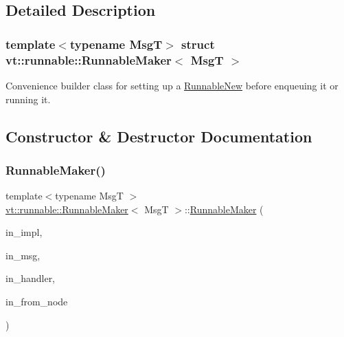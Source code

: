 \subsection{Detailed Description}
\subsubsection*{template$<$typename MsgT$>$\newline
struct vt\+::runnable\+::\+Runnable\+Maker$<$ Msg\+T $>$}

Convenience builder class for setting up a {\ttfamily \hyperlink{structvt_1_1runnable_1_1_runnable_new}{Runnable\+New}} before enqueuing it or running it. 

\subsection{Constructor \& Destructor Documentation}
\mbox{\label{structvt_1_1runnable_1_1_runnable_maker_a8bdfaa900a10d5b950428476ae57c829}} 
\subsubsection{\texorpdfstring{Runnable\+Maker()}{RunnableMaker()}\hspace{0.1cm}{\footnotesize\ttfamily [1/3]}}
{\footnotesize\ttfamily template$<$typename MsgT $>$ \\
\hyperlink{structvt_1_1runnable_1_1_runnable_maker}{vt\+::runnable\+::\+Runnable\+Maker}$<$ MsgT $>$\+::\hyperlink{structvt_1_1runnable_1_1_runnable_maker}{Runnable\+Maker} (\begin{DoxyParamCaption}\item[{\hyperlink{structvt_1_1runnable_1_1_runnable_new}{Runnable\+New} $\ast$}]{in\+\_\+impl,  }\item[{\hyperlink{namespacevt_ab2b3d506ec8e8d1540aede826d84a239}{Msg\+Shared\+Ptr}$<$ MsgT $>$ const \&}]{in\+\_\+msg,  }\item[{\hyperlink{namespacevt_af64846b57dfcaf104da3ef6967917573}{Handler\+Type}}]{in\+\_\+handler,  }\item[{\hyperlink{namespacevt_a866da9d0efc19c0a1ce79e9e492f47e2}{Node\+Type}}]{in\+\_\+from\+\_\+node }\end{DoxyParamCaption})\hspace{0.3cm}{\ttfamily [inline]}}



